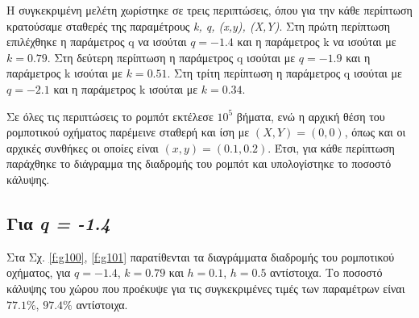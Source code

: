 Η συγκεκριμένη μελέτη χωρίστηκε σε τρεις περιπτώσεις, όπου για την κάθε περίπτωση κρατούσαμε σταθερές της παραμέτρους \emph{k, q, (x,y), (X,Y)}.
Στη πρώτη περίπτωση επιλέχθηκε η παράμετρος q να ισούται $q = -1.4$ και η παράμετρος k να ισούται με $k = 0.79$. Στη δεύτερη περίπτωση η παράμετρος q ισούται με $q = -1.9$ και η παράμετρος k ισούται με $k = 0.51$. Στη τρίτη περίπτωση η παράμετρος q ισούται με $q = -2.1$ και η παράμετρος k ισούται με $k = 0.34$.

Σε όλες τις περιπτώσεις το ρομπότ εκτέλεσε $10^5$ βήματα, ενώ η αρχική θέση του ρομποτικού οχήματος παρέμεινε σταθερή και ίση με $(X,Y) = (0,0)$, όπως και οι αρχικές συνθήκες οι οποίες είναι $(x,y) = (0.1,0.2)$. Έτσι, για κάθε περίπτωση παράχθηκε το διάγραμμα της διαδρομής του ρομπότ και υπολογίστηκε το ποσοστό κάλυψης. 


\subsection{Για \emph{q = -1.4}}

Στα Σχ. \ref{f:g100}, \ref{f:g101} παρατίθενται τα διαγράμματα διαδρομής του ρομποτικού οχήματος, για $q = -1.4$, $k = 0.79$ και $h =0.1$, $h =0.5$ αντίστοιχα. Tο ποσοστό κάλυψης του χώρου που προέκυψε για τις συγκεκριμένες τιμές των παραμέτρων είναι $77.1\%$, $97.4\%$ αντίστοιχα.


